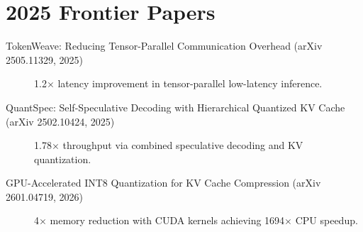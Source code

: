 \documentclass[10pt, oneside, openany]{book}
\begin{document}
\section*{2025 Frontier Papers}

\begin{description}
  \item[TokenWeave: Reducing Tensor-Parallel Communication Overhead
    (arXiv 2505.11329, 2025)]
    1.2$\times$ latency improvement in tensor-parallel low-latency inference.

  \item[QuantSpec: Self-Speculative Decoding with Hierarchical Quantized KV
    Cache (arXiv 2502.10424, 2025)]
    1.78$\times$ throughput via combined speculative decoding and KV quantization.

  \item[GPU-Accelerated INT8 Quantization for KV Cache Compression
    (arXiv 2601.04719, 2026)]
    4$\times$ memory reduction with CUDA kernels achieving 1694$\times$ CPU speedup.
\end{description}

\printindex
\end{document}
